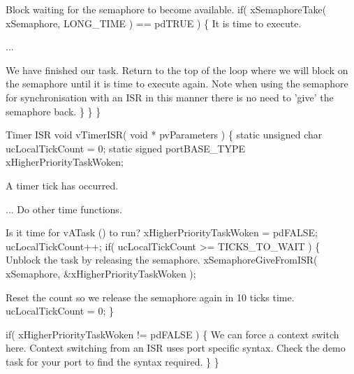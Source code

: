 \begin{DoxyPre}Block waiting for the semaphore to become available.
        if( xSemaphoreTake( xSemaphore, LONG\_TIME ) == pdTRUE )
        \{
It is time to execute.\end{DoxyPre}



\begin{DoxyPre}...\end{DoxyPre}



\begin{DoxyPre}We have finished our task.  Return to the top of the loop where
we will block on the semaphore until it is time to execute 
again.  Note when using the semaphore for synchronisation with an
ISR in this manner there is no need to 'give' the semaphore back.
        \}
    \}
 \}\end{DoxyPre}



\begin{DoxyPre}Timer ISR
 void vTimerISR( void * pvParameters )
 \{
 static unsigned char ucLocalTickCount = 0;
 static signed portBASE\_TYPE xHigherPriorityTaskWoken;\end{DoxyPre}



\begin{DoxyPre}A timer tick has occurred.\end{DoxyPre}



\begin{DoxyPre}... Do other time functions.\end{DoxyPre}



\begin{DoxyPre}Is it time for vATask () to run?
        xHigherPriorityTaskWoken = pdFALSE;
    ucLocalTickCount++;
    if( ucLocalTickCount >= TICKS\_TO\_WAIT )
    \{
Unblock the task by releasing the semaphore.
        xSemaphoreGiveFromISR( xSemaphore, &xHigherPriorityTaskWoken );\end{DoxyPre}



\begin{DoxyPre}Reset the count so we release the semaphore again in 10 ticks time.
        ucLocalTickCount = 0;
    \}\end{DoxyPre}



\begin{DoxyPre}    if( xHigherPriorityTaskWoken != pdFALSE )
    \{
We can force a context switch here.  Context switching from an
ISR uses port specific syntax.  Check the demo task for your port
to find the syntax required.
    \}
 \}
 \end{DoxyPre}
 
